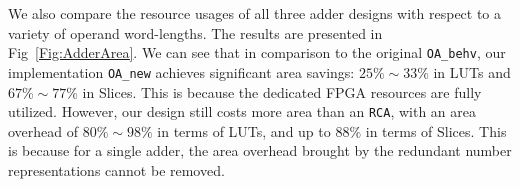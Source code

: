 \documentclass[conference]{IEEEtran}
\begin{document}
We also compare the resource usages of all three adder designs with respect to a variety of operand word-lengths. The results are presented in Fig~\ref{Fig:AdderArea}. We can see that in comparison to the original \texttt{OA\_behv}, our implementation \texttt{OA\_new} achieves significant area savings: $25\%\sim 33\%$ in LUTs and $67\%\sim77\%$ in Slices. This is because the dedicated FPGA resources are fully utilized. However, our design still costs more area than an \texttt{RCA}, with an area overhead of $80\%\sim98\%$ in terms of LUTs, and up to $88\%$ in terms of Slices. This is because for a single adder, the area overhead brought by the redundant number representations cannot be removed.

\begin{figure}[tbp]
  \centering
\end{figure}
\end{document}
